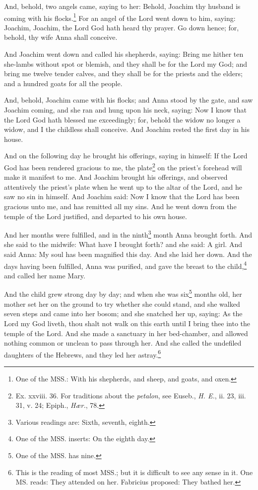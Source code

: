 \pend\pstart
And, behold, two angels came, saying to her: Behold, Joachim thy husband is coming with his
flocks.\footnote{One of the MSS.: With his shepherds, and sheep, and goats, and oxen.} For an angel of the Lord went down to him, saying: Joachim, Joachim, the Lord God hath heard thy prayer. Go down hence; for, behold, thy wife Anna shall conceive.

\pend\pstart
And Joachim went down and called his shepherds, saying: Bring me hither ten she-lambs without spot or blemish, and they shall be for the Lord my God; and bring me twelve tender calves, and they shall be for the priests and the elders; and a hundred goats for all the people.

\pend\pstart
And, behold, Joachim came with his flocks; and Anna stood by the gate, and saw Joachim coming, and she ran and hung upon his neck, saying: Now I know that the Lord God hath blessed me exceedingly; for, behold the widow no longer a widow, and I the childless shall conceive. And Joachim rested the first day in his house.

\pend\pstart
{}

\pend\pstart
And on the following day he brought his offerings, saying in himself: If the Lord God has been rendered gracious to me, the plate\footnote{Ex. xxviii. 36. For traditions about the \textit{petalon}, see Euseb., \textit{H. E.}, ii. 23, iii. 31, v. 24; Epiph., \textit{Hær.}, 78.} on the priest's forehead will make it manifest to me. And Joachim brought his offerings, and observed attentively the priest's plate when he went up to the altar of the Lord, and he saw no sin in himself. And Joachim said: Now I know that the Lord has been gracious unto me, and has remitted all my sins. And he went down from the temple of the Lord justified, and departed to his own house.

\pend\pstart
And her months were fulfilled, and in the ninth\footnote{Various readings are: Sixth, seventh, eighth.} month Anna brought forth. And she said to the midwife: What have I brought forth? and she said: A girl. And said Anna: My soul has been magnified this day. And she laid her down. And the days having been fulfilled, Anna was purified, and gave the breast to the child,\footnote{One of the MSS. inserts: On the eighth day.} and called her name Mary.

\pend\pstart
{}

\pend\pstart
And the child grew strong day by day; and when she was six\footnote{One of the MSS. has nine.} months old, her mother set her on the ground to try whether she could stand, and she walked seven steps and came into her bosom; and she snatched her up, saying: As the Lord my God liveth, thou shalt not walk on this earth until I bring thee into the temple of the Lord. And she made a sanctuary in her bed-chamber, and allowed nothing common or unclean to pass through her. And she called the undefiled daughters of the Hebrews, and they led her astray.\footnote{This is the reading of most MSS.; but it is difficult to see any sense in it. One MS. reads: They attended on her. Fabricius proposed: They bathed her.}


